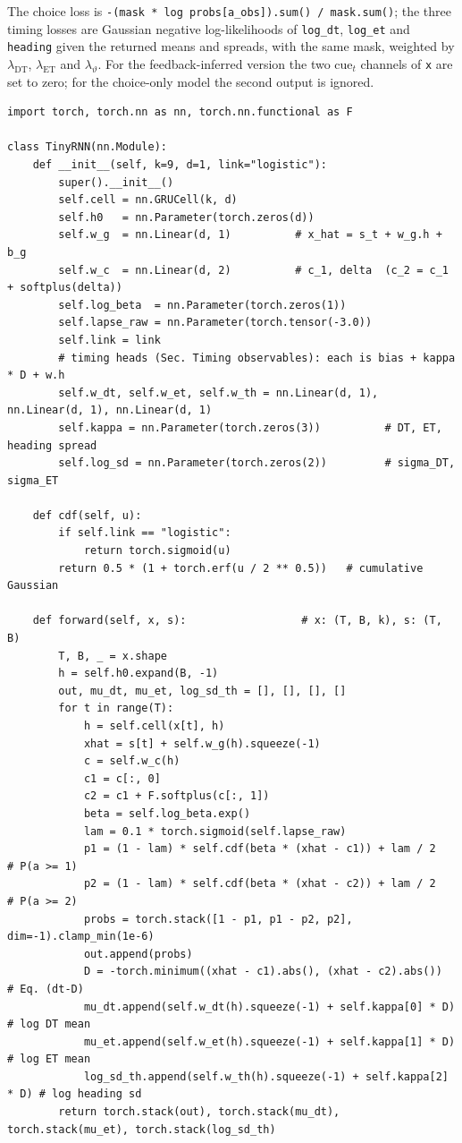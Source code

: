 \documentclass[11pt,a4paper]{article}
\newcommand{\cue}{\mathrm{cue}}
\begin{document}
The choice loss is \texttt{-(mask * log probs[a\_obs]).sum() / mask.sum()}; the three
timing losses are Gaussian negative log-likelihoods of \texttt{log\_dt}, \texttt{log\_et}
and \texttt{heading} given the returned means and spreads, with the same mask, weighted
by $\lambda_{\mathrm{DT}}$, $\lambda_{\mathrm{ET}}$ and $\lambda_{\vartheta}$. For the feedback-inferred version the two $\cue_t$ channels of
\texttt{x} are set to zero; for the choice-only model the second output is ignored.

\begin{lstlisting}
import torch, torch.nn as nn, torch.nn.functional as F

class TinyRNN(nn.Module):
    def __init__(self, k=9, d=1, link="logistic"):
        super().__init__()
        self.cell = nn.GRUCell(k, d)
        self.h0   = nn.Parameter(torch.zeros(d))
        self.w_g  = nn.Linear(d, 1)          # x_hat = s_t + w_g.h + b_g
        self.w_c  = nn.Linear(d, 2)          # c_1, delta  (c_2 = c_1 + softplus(delta))
        self.log_beta  = nn.Parameter(torch.zeros(1))
        self.lapse_raw = nn.Parameter(torch.tensor(-3.0))
        self.link = link
        # timing heads (Sec. Timing observables): each is bias + kappa * D + w.h
        self.w_dt, self.w_et, self.w_th = nn.Linear(d, 1), nn.Linear(d, 1), nn.Linear(d, 1)
        self.kappa = nn.Parameter(torch.zeros(3))          # DT, ET, heading spread
        self.log_sd = nn.Parameter(torch.zeros(2))         # sigma_DT, sigma_ET

    def cdf(self, u):
        if self.link == "logistic":
            return torch.sigmoid(u)
        return 0.5 * (1 + torch.erf(u / 2 ** 0.5))   # cumulative Gaussian

    def forward(self, x, s):                  # x: (T, B, k), s: (T, B)
        T, B, _ = x.shape
        h = self.h0.expand(B, -1)
        out, mu_dt, mu_et, log_sd_th = [], [], [], []
        for t in range(T):
            h = self.cell(x[t], h)
            xhat = s[t] + self.w_g(h).squeeze(-1)
            c = self.w_c(h)
            c1 = c[:, 0]
            c2 = c1 + F.softplus(c[:, 1])
            beta = self.log_beta.exp()
            lam = 0.1 * torch.sigmoid(self.lapse_raw)
            p1 = (1 - lam) * self.cdf(beta * (xhat - c1)) + lam / 2   # P(a >= 1)
            p2 = (1 - lam) * self.cdf(beta * (xhat - c2)) + lam / 2   # P(a >= 2)
            probs = torch.stack([1 - p1, p1 - p2, p2], dim=-1).clamp_min(1e-6)
            out.append(probs)
            D = -torch.minimum((xhat - c1).abs(), (xhat - c2).abs())   # Eq. (dt-D)
            mu_dt.append(self.w_dt(h).squeeze(-1) + self.kappa[0] * D)    # log DT mean
            mu_et.append(self.w_et(h).squeeze(-1) + self.kappa[1] * D)    # log ET mean
            log_sd_th.append(self.w_th(h).squeeze(-1) + self.kappa[2] * D) # log heading sd
        return torch.stack(out), torch.stack(mu_dt), torch.stack(mu_et), torch.stack(log_sd_th)
\end{lstlisting}
\end{document}
